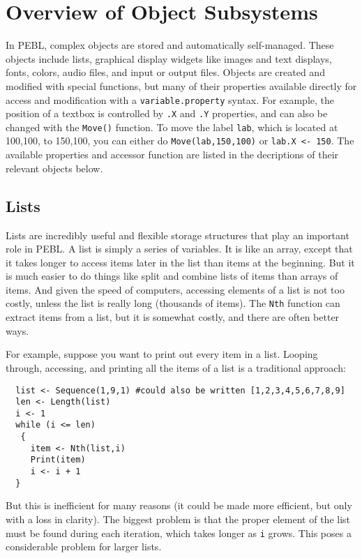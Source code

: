 
\chapter
{Overview  of  Object Subsystems}

In PEBL, complex objects are stored and automatically self-managed.
These objects include lists, graphical display widgets like images and
text displays, fonts, colors, audio files, and input or output files.
Objects are created and modified with special functions, but many of
their properties available directly for access and modification with a
\texttt{variable.property} syntax.  For example, the position of a
textbox is controlled by \verb+.X+ and \verb+.Y+ properties, and can
also be changed with the \verb+Move()+ function.  To move the label
\texttt{lab}, which is located at 100,100, to 150,100, you can either
do \texttt{Move(lab,150,100)} or \verb+lab.X <- 150+.  The available
properties and accessor function are listed in the decriptions of
their relevant objects below.


\section{Lists}

Lists are  incredibly useful and flexible storage
structures that play an important role in PEBL. A list is
simply a series of variables. It is  like an array, except
that it takes longer to access items later in the
list than items at the beginning. But it is much easier to
do things like split and combine lists of items than arrays of items. And given the speed of 
computers, accessing elements of a list is not too costly,
unless the list is really long (thousands of items). The \texttt{Nth} function can extract items from a list, but it is somewhat costly, and there are often better ways.


For example, suppose you want to print out every item in a list. Looping through, accessing, and printing all the items of a list is a traditional approach:
\begin{verbatim}
  list <- Sequence(1,9,1) #could also be written [1,2,3,4,5,6,7,8,9]
  len <- Length(list)
  i <- 1
  while (i <= len)
   {
     item <- Nth(list,i) 
     Print(item)
     i <- i + 1
  } 

\end{verbatim}
But this is inefficient for many reasons (it could be made more
efficient, but only with a loss in clarity). The biggest problem is
that the proper element of the list must be found during each
iteration, which takes longer as \texttt{i} grows. This poses a
considerable problem for larger lists.

